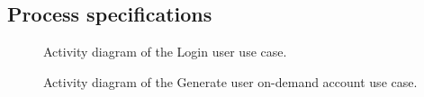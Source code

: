\documentclass[12pt]{article}
\begin{document}
\subsection{Process specifications}
\vspace{0.2in}

\begin{figure}[H]
\centering	
{}
\caption{Activity diagram of the Login user use case.}
\end{figure}

\begin{figure}[H]
\centering	
{}
\caption{Activity diagram of the Generate user on-demand account use case.}
\end{figure}
\end{document}
